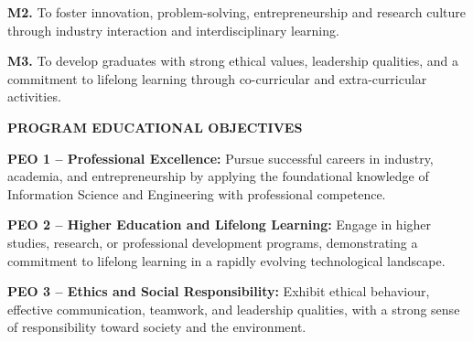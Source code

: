 \begin{center}
\begin{minipage}{0.92\textwidth}
\textbf{M2.}
To foster innovation, problem-solving, entrepreneurship and research
culture through industry interaction and interdisciplinary learning.

\vspace{0.12cm}

\textbf{M3.}
To develop graduates with strong ethical values, leadership qualities,
and a commitment to lifelong learning through co-curricular and
extra-curricular activities.

\vspace{0.3cm}

\begin{center}
{\large\bfseries\textcolor{cyan!70!blue}{PROGRAM EDUCATIONAL OBJECTIVES}}
\end{center}

\textbf{PEO 1 -- Professional Excellence:}
Pursue successful careers in industry, academia, and entrepreneurship
by applying the foundational knowledge of Information Science and
Engineering with professional competence.

\vspace{0.12cm}

\textbf{PEO 2 -- Higher Education and Lifelong Learning:}
Engage in higher studies, research, or professional development
programs, demonstrating a commitment to lifelong learning in a
rapidly evolving technological landscape.

\vspace{0.12cm}

\textbf{PEO 3 -- Ethics and Social Responsibility:}
Exhibit ethical behaviour, effective communication, teamwork, and
leadership qualities, with a strong sense of responsibility toward
society and the environment.

\vspace{0.25cm}



\end{minipage}

\end{center}






\thispagestyle{empty}

